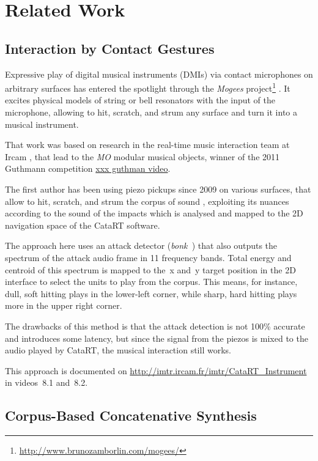 \section{Related Work}

\subsection{Interaction by Contact Gestures}


Expressive play of digital musical instruments (DMIs) via contact microphones on arbitrary surfaces has entered the spotlight through the \textit{Mogees} project\footnote{\url{http://www.brunozamborlin.com/mogees/}}  \cite{Zamborlin14a}.  It excites physical models of string or bell resonators with the input of the microphone, allowing to hit, scratch, and strum any surface and turn it into a musical instrument.  


That work was based on research in the real-time music interaction team at Ircam \cite{Rasamimanana11a,Bevilacqua11b,Zamborlin14a}, that lead to the \textit{MO} modular musical objects, winner of the 2011 Guthmann competition \url{xxx guthman video}.


The first author has been using piezo pickups since 2009 on various surfaces, that allow to hit, scratch, and strum the corpus of sound \cite{Schwarz-nime2012-sound-space}, exploiting
its nuances according to the sound of the impacts which is analysed and mapped to
the 2D navigation space of the CataRT software.


The approach here uses an attack detector (\textit{bonk~}) that also outputs the spectrum of the
attack audio frame in 11 frequency bands.  Total energy and centroid of this spectrum is mapped to
the~x and~y target position in the 2D interface to select the units to play from the corpus.
This means, for instance, dull, soft hitting plays in the lower-left corner, while sharp, hard hitting plays more in the upper right corner.


The drawbacks of this method is that the attack detection is not 100\% accurate and introduces some latency, but since the signal from the piezos is mixed to the
audio played by CataRT, the musical interaction still works.


This approach is documented on \url{http://imtr.ircam.fr/imtr/CataRT_Instrument} in videos~8.1 and~8.2.


\subsection{Corpus-Based Concatenative Synthesis}



